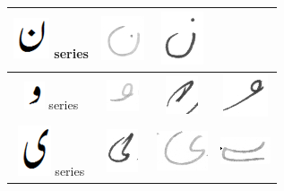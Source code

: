 \documentclass[a4paper,conference]{IEEEtran}
\begin{document}
\begin{table}[h]
\begin{tabular}{@{}cccc@{}}
\hline
\includegraphics[scale=0.15]{noon_orig} series & \includegraphics[scale=0.15]{111} & \includegraphics[scale=0.15]{112} &  \\
\hline
\includegraphics[scale=0.15]{wao_orig} series & \includegraphics[scale=0.15]{113} & \includegraphics[scale=0.15]{114}  & 
\includegraphics[scale=0.15]{115} \\
\hline
\includegraphics[scale=0.15]{choti_ye_orig} series & \includegraphics[scale=0.15]{116} & \includegraphics[scale=0.15]{117} & 
\includegraphics[scale=0.15]{118} \\
\hline
 \end{tabular}
\end{table}
\end{document}
